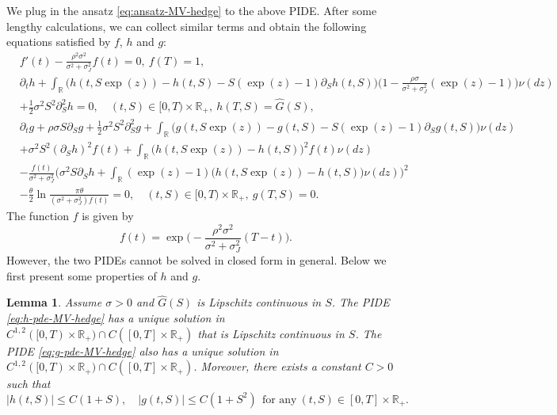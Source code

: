 \documentclass[11pt]{article}
\newtheorem{lemma}{Lemma}
\newcommand{\1}{\mathbbm{1}}
\begin{document}
We plug in the ansatz \eqref{eq:ansatz-MV-hedge} to the above PIDE. After some lengthy calculations, we can collect similar terms and obtain the following equations satisfied by $f$, $h$ and $g$:
\begin{align}
	& f'(t)-\frac{\rho^2\sigma^2}{\sigma^2+\sigma_J^2}f(t)=0,\ f(T)=1, \label{eq:f-ode-MV-hedge}\\
	&\partial_th + \int_\mathbb{R} \big( h(t,S\exp(z)) - h(t,S)- S(\exp(z)-1)\partial_Sh(t,S)\big) \bigg(1-\frac{\rho\sigma}{\sigma^2+\sigma_J^2}(\exp(z)-1)\bigg)\nu(dz)\\
	& + \frac{1}{2}\sigma^2 S^2 \partial_S^2h = 0, \quad (t,S)\in[0,T)\times\mathbb{R}_+,\ h(T,S)=\hat{G}(S), \label{eq:h-pde-MV-hedge}\\
	&\partial_tg + \rho\sigma S \partial_Sg + \frac{1}{2}\sigma^2 S^2 \partial_S^2g + \int_\mathbb{R} \big(g(t,S\exp(z)) - g(t,S)- S(\exp(z)-1)\partial_Sg(t,S)\big)\nu(dz) \\
	& + \sigma^2 S^2(\partial_Sh)^2f(t) + \int_{\mathbb{R}}\big(h(t,S\exp(z))-h(t,S)\big)^2f(t)\nu(dz) \\
	& - \frac{f(t)}{\sigma^2+\sigma_J^2}\bigg(\sigma^2S\partial_Sh + \int_{\mathbb{R}}(\exp(z)-1)\big(h(t,S\exp(z))-h(t,S)\big)\nu(dz)\bigg)^2 \\	
	& - \frac{\theta}{2}\ln\frac{\pi\theta}{(\sigma^2+\sigma_J^2)f(t)} = 0, \quad (t,S)\in[0,T)\times\mathbb{R}_+,\ g(T,S)=0. \label{eq:g-pde-MV-hedge}
\end{align}
The function $f$ is given by
\begin{equation}\label{eq:ft}
f(t)=\exp\bigg(-\frac{\rho^2\sigma^2}{\sigma^2+\sigma_J^2}(T-t)\bigg).	
\end{equation}
However, the two PIDEs cannot be solved in closed form in general. Below we first present some properties of $h$ and $g$.
\begin{lemma}\label{lem:pde-MV-hedge}
	Assume $\sigma>0$ and $\hat{G}(S)$ is Lipschitz continuous in $S$. The PIDE \eqref{eq:h-pde-MV-hedge} has a unique solution in $C^{1,2}([0,T)\times\mathbb{R}_{+})\cap C([0,T]\times\mathbb{R}_{+})$ that is Lipschitz continuous in $S$. The PIDE \eqref{eq:g-pde-MV-hedge} also has a unique solution in $C^{1,2}([0,T)\times\mathbb{R}_{+})\cap C([0,T]\times\mathbb{R}_{+})$. Moreover, there exists a constant $C>0$ such that
	\begin{equation}
		|h(t,S)|\leq C(1+S),\quad |g(t,S)|\leq C(1+S^2)\ \ \text{for any}\ (t,S)\in[0,T]\times\mathbb{R}_+.
	\end{equation}
\end{lemma}
\end{document}
